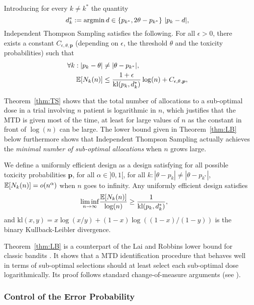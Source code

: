 \begin{theorem}\label{thm:TS}  Introducing for every $k\neq k^*$ the quantity  
\[d_k^* := \operatorname*{argmin}{d \in \{p_{k^*},2\theta - p_{k^*}\}} \ |p_k - d |,\]
Independent Thompson Sampling satisfies the following. For all $\epsilon >0$, there exists a constant $C_{\epsilon,\theta,\bm p}$ (depending on $\epsilon$, the threshold $\theta$ and the toxicity probabilities) such that 
\begin{align*}
\forall k : |p_k - \theta| &\neq |\theta - p_{k^*}|,
\\
\mathbb{E}[N_{k}(n)]  &\leq \frac{1 + \epsilon}{\mathrm{kl}(p_k,d_k^*)} \log(n) + C_{\epsilon,\theta,\bm p},
\end{align*}

\end{theorem}

Theorem~\ref{thm:TS} shows that the total number of allocations to a sub-optimal dose in a trial involving $n$ patient is logarithmic in $n$, which justifies that the MTD is given most of the time, at least for large values of $n$ as the constant in front of $\log(n)$ can be large.  
The lower bound given in Theorem~\ref{thm:LB} below furthermore shows that Independent Thompson Sampling actually achieves the \emph{minimal number of sub-optimal allocations} when $n$ grows large. 

\begin{theorem}\label{thm:LB} We define a uniformly efficient design as a design satisfying for all possible toxicity probabilities $\bm p$, for all $\alpha \in ]0,1[$, for all $k : |\theta - p_k| \neq |\theta - p_{k^*}|$, $\mathbb{E}[N_k(n)] = o(n^\alpha)$ when $n$ goes to infinity. Any uniformly efficient design satisfies 
\begin{align*}
\liminf_{n \rightarrow \infty} &\frac{\mathbb{E}[N_k(n)]}{\log(n)}
	\geq \frac{1}{\mathrm{kl}(p_k,d_k^*)},
\end{align*}
and $\mathrm{kl}(x,y) = x\log(x/y)+(1-x)\log((1-x)/(1-y))$ is the binary Kullback-Leibler divergence.
\end{theorem}


Theorem~\ref{thm:LB} is a counterpart of the Lai and Robbins lower bound for classic bandits \citep{LaiRobbins85bandits}. It shows that a MTD identification procedure that behaves well in terms of sub-optimal selections should at least select each sub-optimal dose logarithmically. Its proof follows standard change-of-measure arguments (see \cite{GMS18}). 


\subsubsection{Control of the Error Probability}

